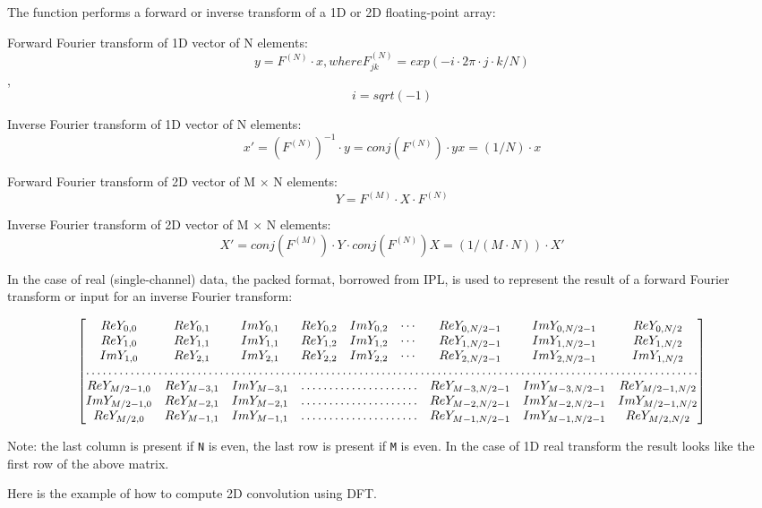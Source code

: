 The function performs a forward or inverse transform of a 1D or 2D floating-point array:


Forward Fourier transform of 1D vector of N elements:
\[y = F^{(N)} \cdot x, where F^{(N)}_{jk}=exp(-i \cdot 2\pi \cdot j \cdot k/N)\], 
\[i=sqrt(-1)\]

Inverse Fourier transform of 1D vector of N elements:
\[x'= (F^{(N)})^{-1} \cdot y = conj(F^(N)) \cdot y
x = (1/N) \cdot x\]

Forward Fourier transform of 2D vector of M $\times$ N elements:
\[Y = F^{(M)} \cdot X \cdot F^{(N)}\]

Inverse Fourier transform of 2D vector of M $\times$ N elements:
\[X'= conj(F^{(M)}) \cdot Y \cdot conj(F^{(N)})
X = (1/(M \cdot N)) \cdot X'\]


In the case of real (single-channel) data, the packed format, borrowed from IPL, is used to represent the result of a forward Fourier transform or input for an inverse Fourier transform:

\[\begin{bmatrix}
Re Y_{0,0} & Re Y_{0,1} & Im Y_{0,1} & Re Y_{0,2} & Im Y_{0,2} & \cdots & Re Y_{0,N/2-1} & Im Y_{0,N/2-1} & Re Y_{0,N/2} \\
Re Y_{1,0} & Re Y_{1,1} & Im Y_{1,1} & Re Y_{1,2} & Im Y_{1,2} & \cdots & Re Y_{1,N/2-1} & Im Y_{1,N/2-1} & Re Y_{1,N/2} \\
Im Y_{1,0} & Re Y_{2,1} & Im Y_{2,1} & Re Y_{2,2} & Im Y_{2,2} & \cdots & Re Y_{2,N/2-1} & Im Y_{2,N/2-1} & Im Y_{1,N/2} \\
\hdotsfor{9} \\
Re Y_{M/2-1,0} &  Re Y_{M-3,1}  & Im Y_{M-3,1} & \hdotsfor{3} & Re Y_{M-3,N/2-1} & Im Y_{M-3,N/2-1}& Re Y_{M/2-1,N/2} \\
Im Y_{M/2-1,0} &  Re Y_{M-2,1}  & Im Y_{M-2,1} & \hdotsfor{3} & Re Y_{M-2,N/2-1} & Im Y_{M-2,N/2-1}& Im Y_{M/2-1,N/2} \\
Re Y_{M/2,0}  &  Re Y_{M-1,1} &  Im Y_{M-1,1} & \hdotsfor{3} & Re Y_{M-1,N/2-1} & Im Y_{M-1,N/2-1}& Re Y_{M/2,N/2}
\end{bmatrix}
\]


Note: the last column is present if \texttt{N} is even, the last row is present if \texttt{M} is even.
In the case of 1D real transform the result looks like the first row of the above matrix.

Here is the example of how to compute 2D convolution using DFT.

